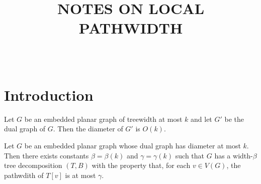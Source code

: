 \documentclass{patmorin}
\title{\MakeUppercase{Notes on Local Pathwidth}}
\author{\ } %
\begin{document}
\maketitle

\section{Introduction}

\begin{lem}
  Let $G$ be an embedded planar graph of treewidth at most $k$ and let
  $G'$ be the dual graph of $G$.  Then the diameter of $G'$ is $O(k)$.
\end{lem}


\begin{lem}
  Let $G$ be an embedded planar graph whose dual graph has diameter at most
  $k$. Then there exists constants $\beta=\beta(k)$ and $\gamma=\gamma(k)$
  such that $G$ has a width-$\beta$ tree decomposition $(T,B)$ with
  the property that, for each $v\in V(G)$, the pathwdith of $T[v]$
  is at most $\gamma$.
\end{lem}
\end{document}
